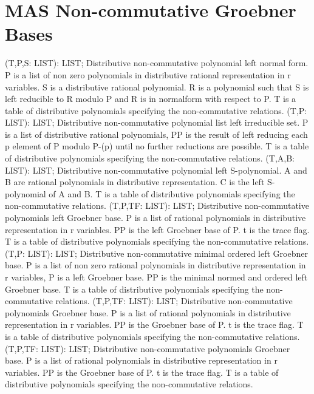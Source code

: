 \section{ MAS Non-commutative Groebner Bases  } 
 (T,P,S: LIST): LIST; \eproc
\bcom Distributive non-commutative polynomial left normal form.
P is a list of non zero polynomials in distributive rational
representation in r variables. S is a distributive rational
polynomial. R is a polynomial such that S is left reducible to R
modulo P and R is in normalform with respect to P.
T is a table of distributive polynomials specifying the
non-commutative relations.  \ecom 
{} (T,P: LIST): LIST; \eproc
\bcom Distributive non-commutative polynomial list left irreducible set.
P is a list of distributive rational polynomials, PP is the
result of left reducing each p element of P modulo P-(p)
until no further reductions are possible.
T is a table of distributive polynomials specifying the
non-commutative relations.  \ecom 
{} (T,A,B: LIST): LIST; \eproc
\bcom Distributive non-commutative polynomial left S-polynomial.
A and B are rational polynomials in distributive representation.
C is the left S-polynomial of A and B.
T is a table of distributive polynomials specifying the
non-commutative relations.  \ecom 
{} (T,P,TF: LIST): LIST; \eproc
\bcom Distributive non-commutative polynomials left Groebner base.
P is a list of rational polynomials in distributive representation
in r variables. PP is the left Groebner base of P. t is the
trace flag.
T is a table of distributive polynomials specifying the
non-commutative relations.  \ecom 
{} (T,P: LIST): LIST; \eproc
\bcom Distributive non-commutative minimal ordered left Groebner base.
P is a list of non zero rational polynomials in distributive
representation in r variables, P is a left Groebner base.
PP is the minimal normed and ordered left Groebner base.
T is a table of distributive polynomials specifying the
non-commutative relations.  \ecom 
{} (T,P,TF: LIST): LIST; \eproc
\bcom Distributive non-commutative polynomials Groebner base.
P is a list of rational polynomials in distributive representation
in r variables. PP is the Groebner base of P. t is the
trace flag.
T is a table of distributive polynomials specifying the
non-commutative relations.  \ecom 
{} (T,P,TF: LIST): LIST; \eproc
\bcom Distributive non-commutative polynomials Groebner base.
P is a list of rational polynomials in distributive representation
in r variables. PP is the Groebner base of P. t is the
trace flag.
T is a table of distributive polynomials specifying the
non-commutative relations.  \ecom 
